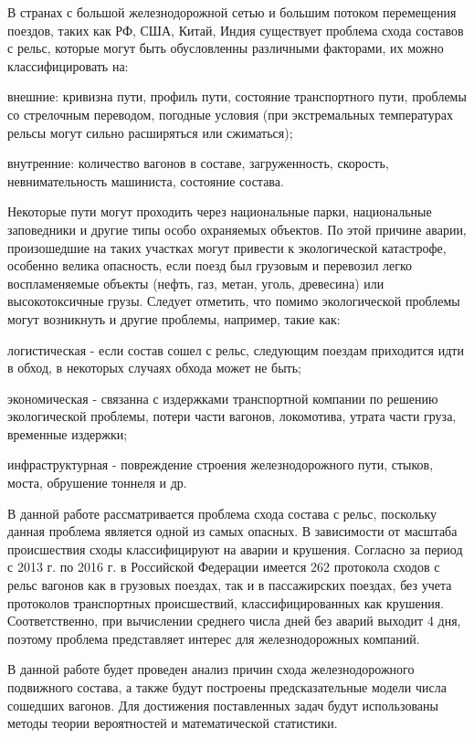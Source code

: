В странах с большой железнодорожной сетью и большим потоком перемещения поездов, таких как РФ, США, Китай, Индия существует проблема схода составов с рельс, которые могут быть обусловленны различными факторами, их можно классифицировать на:

\begin{description}[font=$\bullet$]
\item внешние: кривизна пути, профиль пути, состояние транспортного пути, проблемы со стрелочным переводом, погодные условия (при экстремальных температурах рельсы могут сильно расширяться или сжиматься);
    
\item внутренние: количество вагонов в составе, загруженность, скорость, невнимательность машиниста, состояние состава.
\end{description}
Некоторые пути могут проходить через национальные парки, национальные заповедники и другие типы особо охраняемых объектов. По этой причине аварии, произошедшие на таких участках могут привести к экологической катастрофе, особенно велика опасность, если поезд был грузовым и перевозил легко воспламеняемые объекты (нефть, газ, метан, уголь, древесина) или высокотоксичные грузы. Следует отметить, что помимо экологической проблемы могут возникнуть и другие проблемы, например, такие как:

\begin{description}[font=$\bullet$]
\item логистическая - если состав сошел с рельс, следующим поездам приходится идти в обход, в некоторых случаях обхода может не быть;
\item экономическая - связанна с издержками транспортной компании по решению экологической проблемы, потери части вагонов, локомотива, утрата части груза, временные издержки;
\item инфраструктурная - повреждение строения железнодорожного пути, стыков, моста, обрушение тоннеля и др.
\end{description}
В данной работе рассматривается проблема схода состава с рельс, поскольку данная проблема является одной из самых опасных. В зависимости от масштаба происшествия сходы классифицируют на аварии и крушения. Согласно \cite{Ignatov:functional_dependence} за период с 2013 г. по 2016 г. в Российской Федерации имеется 262 протокола сходов с рельс вагонов как в грузовых поездах, так и в пассажирских поездах, без учета протоколов транспортных происшествий, классифицированных как крушения. Соответственно, при вычислении среднего числа дней без аварий выходит 4 дня, поэтому проблема представляет интерес для железнодорожных компаний.

В данной работе будет проведен анализ причин схода железнодорожного подвижного состава, а также будут построены предсказательные модели числа сошедших вагонов. Для достижения поставленных задач будут использованы методы теории вероятностей и математической статистики.

